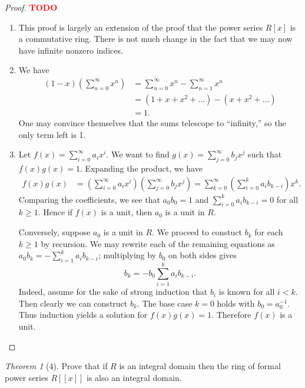 \documentclass[12pt]{article}
\theoremstyle{remark}
\theoremstyle{named}
\newtheorem*{theorem}{Theorem}
\newcommand{\todo}{\textcolor{red}{\textbf{TODO} }}
\begin{document}
\begin{proof}
    \todo 
    \begin{enumerate}
        \item This proof is largely an extension of the proof that the power series \(R[x]\) is a commutative ring. There is not much change in the fact that we may now have infinite nonzero indices. 
        
        \item We have 
        \begin{align*}
            (1 - x) \left(\sum_{n = 0}^\infty x^n\right) &= \sum_{n = 0}^\infty x^n - \sum_{n = 1}^\infty x^n \\
            &= (1 + x + x^2 + \dots) - (x + x^2 + \dots) \\
            &= 1.
        \end{align*}
        One may convince themselves that the sums telescope to ``infinity,'' so the only term left is 1.
        \item Let \(f(x) = \sum_{i = 0}^\infty a_i x^i\). We want to find \(g(x) = \sum_{j = 0}^\infty b_j x^j\) such that \(f(x)g(x) = 1\). Expanding the product, we have
        \begin{align*}
            f(x)g(x) &= \left(\sum_{i = 0}^\infty a_i x^i\right)\left(\sum_{j = 0}^\infty b_j x^j\right) = \sum_{k = 0}^\infty \left(\sum_{i = 0}^k a_i b_{k - i}\right) x^k.
        \end{align*}
        Comparing the coefficients, we see that \(a_0 b_0 = 1\) and \(\sum_{i = 0}^k a_i b_{k - i} = 0\) for all \(k \ge 1\). Hence if \(f(x)\) is a unit, then \(a_0\) is a unit in \(R\). 
        
        Conversely, suppose \(a_0\) is a unit in \(R\). We proceed to constuct \(b_k\) for each \(k \ge 1\) by recursion. We may rewrite each of the remaining equations as \(a_0 b_k = - \sum_{i = 1}^k a_i b_{k - i}\); multiplying by \(b_0\) on both sides gives
        \[b_k = -b_0\sum_{i = 1}^k a_i b_{k - i}.\]
        Indeed, assume for the sake of strong induction that \(b_i\) is known for all \(i < k\). Then clearly we can construct \(b_k\). The base case \(k = 0\) holds with \(b_0 = a_0^{-1}\). Thus induction yields a solution for \(f(x)g(x) = 1\). Therefore \(f(x)\) is a unit. 
    \end{enumerate}
\end{proof}

\begin{theorem}[4]
    Prove that if \(R\) is an integral domain then the ring of formal power series \(R[[x]]\) is also an integral domain.
\end{theorem}
\end{document}
